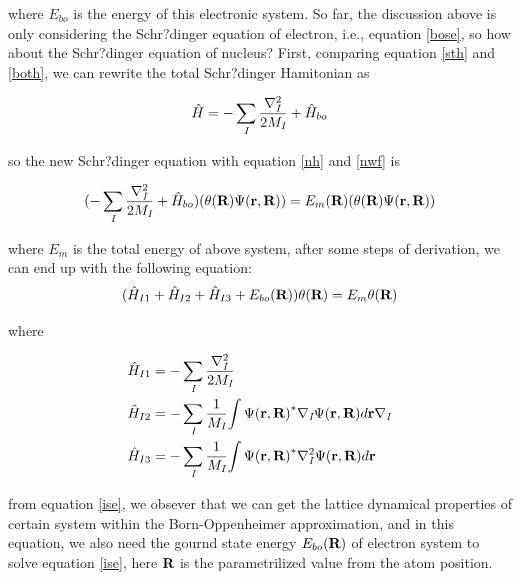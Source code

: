 \documentclass[a4paper, 12pt, titlepage,oneside,drop]{kthesis}
\begin{document}
\noindent where $E_\textit{bo}$ is the energy of this electronic system. So far,
the discussion above is only considering the Schr?dinger equation of electron, i.e., equation \ref{bose}, so how about the Schr?dinger equation of nucleus? First, comparing equation
\ref{sth} and \ref{both}, we can rewrite the total Schr?dinger Hamitonian as 

\begin{equation}\label{nh}
 {\hath} = - \sumi<I> \frac{{{\nabla}_{\textit{I}}^{2}}}{2 M_\textit{I}} + {\hath}_{bo}
\end{equation}

\noindent so the new Schr?dinger equation with equation \ref{nh} and \ref{nwf} is 

\begin{equation}
 (- \sumi<I> \frac{{{\nabla}_{\textit{I}}^{2}}}{2 M_\textit{I}} + {\hath}_{bo} ) ( {\theta(\textbf{R})} {\Psi(\textbf{r}, \textbf{R})}) = E_{m}({\textbf R}) ({\theta(\textbf{R})} {\Psi(\textbf{r}, \textbf{R})} )
\end{equation}
 
\noindent where $E_{m}$ is the total energy of above system, after some steps of derivation, we can end up with the following equation:
\begin{equation}\label{ise}
( \hat{H}_{I1}+\hat{H}_{I2}+\hat{H}_{I3}+E_{bo}({\textbf R}) ) {\theta(\textbf{R})} = {E_m} {\theta(\textbf{R})}
\end{equation}

\noindent where

\begin{equation}\begin{split}
 &  \hat{H}_{I1} = - \sumi<I> \frac{{{\nabla}_{\textit{I}}^{2}}}{2 M_\textit{I}}   \\
 &  \hat{H}_{I2} = - \sumi<I> \frac{1}{M_\textit{I}} {\int {\Psi(\textbf{r}, \textbf{R})}^{\ast} {{\nabla}_{\textit{I}}} {\Psi(\textbf{r}, \textbf{R})} d {\textbf r }} {{\nabla}_{\textit{I}}} \\
 &  \hat{H}_{I3} = - \sumi<I> \frac{1}{M_\textit{I}} {\int {\Psi(\textbf{r}, \textbf{R})}^{\ast} {{\nabla}_{\textit{I}}^{2}} {\Psi(\textbf{r}, \textbf{R})} d {\textbf r }} 
\end{split}\end{equation}

\noindent from equation \ref{ise}, we obsever that we can get the lattice dynamical properties of certain system within the Born-Oppenheimer approximation, and in this equation,
we also need the gournd state energy $E_{bo}({\textbf R})$ of electron system to solve equation \ref{ise}, here $\textbf R$ is the parametrilized value from the atom position.
 
\end{document}

